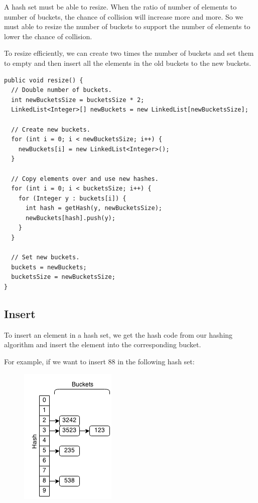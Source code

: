 \documentclass[11pt,oneside]{book}
\makeatletter
\def\maxwidth#1{\ifdim\Gin@nat@width>#1 #1\else\Gin@nat@width\fi}
\makeatother
\begin{document}
A hash set must be able to resize. When the ratio of number of elements to number of buckets, the chance of collision will increase more and more. So we must able to resize the number of buckets to support the number of elements to lower the chance of collision.

To resize efficiently, we can create two times the number of buckets and set them to empty and then insert all the elements in the old buckets to the new buckets.

\begin{lstlisting}
public void resize() {
  // Double number of buckets.
  int newBucketsSize = bucketsSize * 2;
  LinkedList<Integer>[] newBuckets = new LinkedList[newBucketsSize];
  
  // Create new buckets.
  for (int i = 0; i < newBucketsSize; i++) {
    newBuckets[i] = new LinkedList<Integer>();
  }
  
  // Copy elements over and use new hashes.
  for (int i = 0; i < bucketsSize; i++) {
    for (Integer y : buckets[i]) {
      int hash = getHash(y, newBucketsSize);
      newBuckets[hash].push(y);
    }
  }
  
  // Set new buckets.
  buckets = newBuckets;
  bucketsSize = newBucketsSize;
}
\end{lstlisting}

\subsection{Insert}

To insert an element in a hash set, we get the hash code from our hashing algorithm and insert the element into the corresponding bucket.

For example, if we want to insert 88 in the following hash set:

\vspace{5px}\begin{figure}[H]\centering
        \includegraphics[width=0.66\maxwidth{\textwidth}]{hashset.png}
        \end{figure}
\end{document}
